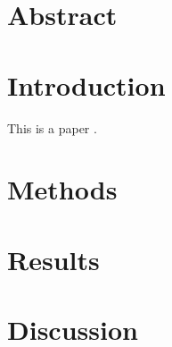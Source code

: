 \section*{Abstract}

\lipsum[1-1]

\section*{Introduction}

This is a paper \citep{Love2014}.

\lipsum[1-1]

\section*{Methods}

\lipsum[1-1]

\section*{Results}

\lipsum[1-1]

\section*{Discussion}

\lipsum[1-1]
